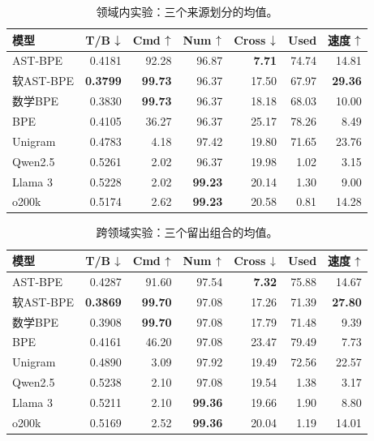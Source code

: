 \begin{table}[H]
\centering\fontsize{8}{9.4}\selectfont\setlength{\tabcolsep}{2.0pt}\renewcommand{\arraystretch}{1.06}
\caption{领域内实验：三个来源划分的均值。}\label{tab:id}
\begin{tabular}{lrrrrrr}\toprule
模型&T/B $\downarrow$&Cmd $\uparrow$&Num $\uparrow$&Cross $\downarrow$&Used&速度 $\uparrow$\\\midrule
AST-BPE & 0.4181 & 92.28 & 96.87 & \textbf{7.71} & 74.74 & 14.81 \\
软AST-BPE & \textbf{0.3799} & \textbf{99.73} & 96.37 & 17.50 & 67.97 & \textbf{29.36} \\
数学BPE & 0.3830 & \textbf{99.73} & 96.37 & 18.18 & 68.03 & 10.00 \\
BPE & 0.4105 & 36.27 & 96.37 & 25.17 & 78.26 & 8.49 \\
Unigram & 0.4783 & 4.18 & 97.42 & 19.80 & 71.65 & 23.76 \\
\midrule
Qwen2.5 & 0.5261 & 2.02 & 96.37 & 19.98 & 1.02 & 3.15 \\
Llama 3 & 0.5228 & 2.02 & \textbf{99.23} & 20.14 & 1.30 & 9.00 \\
o200k & 0.5174 & 2.62 & \textbf{99.23} & 20.58 & 0.81 & 14.28 \\
\bottomrule\end{tabular}
\end{table}

\begin{table}[H]
\centering\fontsize{8}{9.4}\selectfont\setlength{\tabcolsep}{2.0pt}\renewcommand{\arraystretch}{1.06}
\caption{跨领域实验：三个留出组合的均值。}\label{tab:ood}
\begin{tabular}{lrrrrrr}\toprule
模型&T/B $\downarrow$&Cmd $\uparrow$&Num $\uparrow$&Cross $\downarrow$&Used&速度 $\uparrow$\\\midrule
AST-BPE & 0.4287 & 91.60 & 97.54 & \textbf{7.32} & 75.88 & 14.67 \\
软AST-BPE & \textbf{0.3869} & \textbf{99.70} & 97.08 & 17.26 & 71.39 & \textbf{27.80} \\
数学BPE & 0.3908 & \textbf{99.70} & 97.08 & 17.79 & 71.48 & 9.39 \\
BPE & 0.4161 & 46.20 & 97.08 & 23.47 & 79.49 & 7.73 \\
Unigram & 0.4890 & 3.09 & 97.92 & 19.49 & 72.56 & 22.57 \\
\midrule
Qwen2.5 & 0.5238 & 2.10 & 97.08 & 19.54 & 1.38 & 3.17 \\
Llama 3 & 0.5211 & 2.10 & \textbf{99.36} & 19.66 & 1.90 & 8.80 \\
o200k & 0.5169 & 2.52 & \textbf{99.36} & 20.04 & 1.19 & 14.01 \\
\bottomrule\end{tabular}
\end{table}

